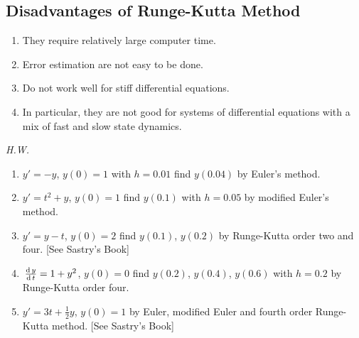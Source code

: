 \documentclass[../main-sheet.tex]{subfiles}
\begin{document}
\subsection{Disadvantages of Runge-Kutta Method}
\begin{enumerate}
    \item They require relatively large computer time.
    \item Error estimation are not easy to be done.
    \item Do not work well for stiff differential equations.
    \item In particular, they are not good for systems of differential equations with a mix of fast and slow state dynamics.
\end{enumerate}
\emph{H.W.}
\begin{enumerate}
    \item \(y'=-y\), \(y(0)=1\) with \(h=0.01\) find \(y(0.04)\) by Euler's method.
    \item \(y'=t^2+y\), \(y(0)=1\) find \(y(0.1)\) with \(h=0.05\)  by modified  Euler's method.
    \item \(y'=y-t\), \(y(0)=2\) find \(y(0.1)\), \(y(0.2)\)  by Runge-Kutta order two and four. [See Sastry's Book]
    \item \(\,\frac{\mathrm{d}\,y}{\mathrm{d}\,t}=1+y^2\), \(y(0)=0\) find \(y(0.2)\), \(y(0.4)\), \(y(0.6)\) with \(h=0.2\) by Runge-Kutta order four.
    \item \({y}'=3t+\frac{1}{2}y\), \(y(0)=1\) by Euler, modified Euler and fourth order Runge-Kutta method. [See Sastry's Book]
\end{enumerate}
\end{document}
